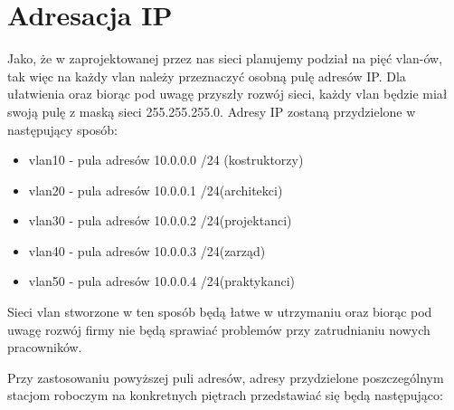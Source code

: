 \documentclass[a4paper, 12pt]{article}
\begin{document}
\section{Adresacja IP}

Jako, że w zaprojektowanej przez nas sieci planujemy podział na pięć vlan-ów, tak więc na każdy vlan należy przeznaczyć osobną pulę adresów IP. Dla ułatwienia oraz biorąc pod uwagę przyszły rozwój sieci, każdy vlan będzie miał swoją pulę z maską sieci 255.255.255.0. Adresy IP zostaną przydzielone w następujący sposób:

\begin{itemize}
\item vlan10 - pula adresów 10.0.0.0 /24 (kostruktorzy) 
\item vlan20 - pula adresów 10.0.0.1 /24(architekci)
\item vlan30 - pula adresów 10.0.0.2 /24(projektanci)
\item vlan40 - pula adresów 10.0.0.3 /24(zarząd)
\item vlan50 - pula adresów 10.0.0.4 /24(praktykanci)
\end{itemize}

Sieci vlan stworzone w ten sposób będą łatwe w utrzymaniu oraz biorąc pod uwagę rozwój firmy nie będą sprawiać problemów przy zatrudnianiu nowych pracowników.

Przy zastosowaniu powyższej puli adresów, adresy przydzielone poszczególnym stacjom roboczym na konkretnych piętrach przedstawiać się będą następująco:
\end{document}
